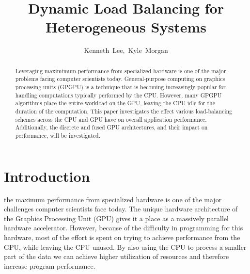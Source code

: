 \documentclass[journal]{IEEEtran}
\begin{document}
\title{Dynamic Load Balancing for\\Heterogeneous Systems}

\author{Kenneth~Lee,~Kyle~Morgan}%


\maketitle

\begin{abstract}
Leveraging maximimum performance from specialized hardware is one of the
major problems facing computer scientists today.  General-purpose computing
on graphics processing units (GPGPU) is a technique that is becoming
increasingly popular for handling computations typically performed by the
CPU.  However, many GPGPU algorithms place the entire workload on the GPU,
leaving the CPU idle for the duration of the computation.  This paper
investigates the effect various load-balancing schemes across the CPU and
GPU have on overall application performance.  Additionally, the discrete and
fused GPU architectures, and their impact on performance, will be investigated.
\end{abstract}

\section{Introduction}
% 
% 
% 
 the maximum performance from specialized hardware is one
of the major challenges computer scientists face today.  The unique hardware architecture
of the Graphics Processing Unit (GPU) gives it a place as a massively parallel hardware
accelerator.  However, because of the difficulty in programming for this hardware,
most of the effort is spent on trying to achieve performance from the GPU, while
leaving the CPU unused.  By also using the CPU to process a smaller part of the
data we can achieve higher utilization of resources and therefore increase program
performance.
\end{document}
